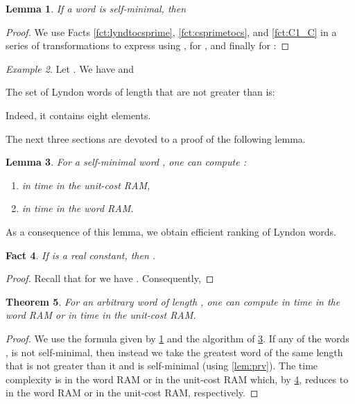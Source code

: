\documentclass{article}
\newcommand{\mayqed}{}
\newtheorem{theorem}{Theorem}
\newtheorem{lemma}[theorem]{Lemma}
\newtheorem{fact}[theorem]{Fact}
\theoremstyle{definition}
\theoremstyle{remark}
\newtheorem{example}[theorem]{Example}
\begin{document}
\begin{lemma}\label{lem:formula}
  If a word  is self-minimal, then
  
\end{lemma}
\begin{proof}
We use Facts \ref{fct:lyndtocsprime}, \ref{fct:csprimetocs}, and \ref{fct:C1_C} in a series of transformations to express
 using ,  for , and finally  for :

\mayqed\end{proof}

\begin{example}
  Let . We have   and 
  
  
  The set of Lyndon words of length  that are not greater than  is:
  
  Indeed, it contains eight elements.
\end{example}

The next three sections are devoted to a proof of the following lemma.

\begin{lemma}\label{lem:csgen}
  For a self-minimal word , one can compute :
  \begin{enumerate}[label={(\alph*)}]
    \item\label{aaa} in  time in the unit-cost RAM,
    \item\label{bbb} in  time in the word RAM.
  \end{enumerate}
\end{lemma}

\noindent
As a consequence of this lemma, we obtain efficient ranking of Lyndon words.

\begin{fact}\label{fct:div}
  If  is a real constant,
  then .
\end{fact}
\begin{proof}
  Recall that for  we have . Consequently,
  

\vspace*{-1.1cm}\mayqed\end{proof}

\begin{theorem}\label{thm:lynd}
  For an arbitrary word  of length , one can compute   in  time in the word RAM or
  in  time in the unit-cost RAM.
\end{theorem}
\begin{proof}
  We use the formula given by \cref{lem:formula} and the algorithm of \cref{lem:csgen}.
  If any of the words ,  is not self-minimal, then instead we take the greatest word of the same length that is
  not greater than it and is self-minimal (using \cref{lem:prv}).
  The time complexity is  in the word RAM
  or  in the unit-cost RAM which, by \cref{fct:div}, reduces to  in the word RAM
  or  in the unit-cost RAM, respectively.
\mayqed\end{proof}
\end{document}
